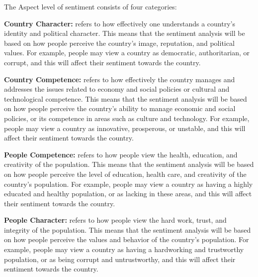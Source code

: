 \documentclass[conference]{IEEEtran}
\begin{document}
The Aspect level of sentiment consists of four categories: 


 \textbf{Country Character:} refers to how effectively one understands a country's identity and political character. This means that the sentiment analysis will be based on how people perceive the country's image, reputation, and political values. For example, people may view a country as democratic, authoritarian, or corrupt, and this will affect their sentiment towards the country.
 
 \textbf{Country Competence:} refers to how effectively the country manages and addresses the issues related to economy and social policies or cultural and technological competence. This means that the sentiment analysis will be based on how people perceive the country's ability to manage economic and social policies, or its competence in areas such as culture and technology. For example, people may view a country as innovative, prosperous, or unstable, and this will affect their sentiment towards the country.
 
 \textbf{People Competence:} refers to how people view the health, education, and creativity of the population. This means that the sentiment analysis will be based on how people perceive the level of education, health care, and creativity of the country's population. For example, people may view a country as having a highly educated and healthy population, or as lacking in these areas, and this will affect their sentiment towards the country.
 
 \textbf{People Character:} refers to how people view the hard work, trust, and integrity of the population. This means that the sentiment analysis will be based on how people perceive the values and behavior of the country's population. For example, people may view a country as having a hardworking and trustworthy population, or as being corrupt and untrustworthy, and this will affect their sentiment towards the country.\\
 
\begin{table}[]
\centering
\caption{Aspect based sentiments}
\label{tab:my-table}
\\
\end{table}
\end{document}
